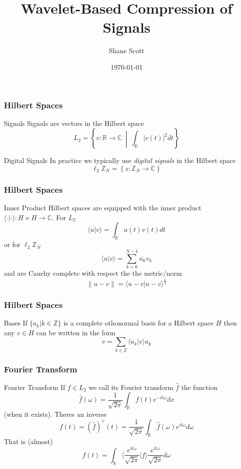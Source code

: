 \documentclass[10pt]{beamer}
\title{Wavelet-Based Compression of Signals}
\author{ Shane Scott }
\date{\today}
\institute{Kansas State University}
\newcommand{\Z}{\mathbb{Z}}
\newcommand{\C}{\mathbb{C}}
\newcommand{\R}{\mathbb{R}}
\begin{document}
\begin{frame}
\titlepage
\end{frame}

\begin{frame}
\frametitle{Hilbert Spaces}
\begin{block}
{Signals} Signals are vectors in the Hilbert space
$$
L_2 = \left \{ v: \R \to \C \  \middle | \ \int_\R |v(t)|^2 dt \right \}
$$
\end{block}
\pause
\begin{block}
{Digital Signals}
In practice we typically use \emph{digital signals} in the Hilbert space 
$$
\ell_2\Z_N = \left \{ z: \Z_N \to \C  \right \}
$$
\end{block}
\end{frame}

\begin{frame}
\frametitle{Hilbert Spaces}
\begin{block}
{Inner Product} Hilbert spaces are equipped with the inner product $\langle \cdot | \cdot \rangle: H \times H \to \C$. For $L_2$
$$
\langle u|v\rangle= \int_\R \overline{u(t)}v(t) dt
$$
\pause or for $\ell_2 \Z_N$
$$
\langle u|v\rangle = \sum^{N-1}_{k=0} \overline{u_k}{v_k}
$$
\pause and are Cauchy complete with respect the the metric/norm
$$
\|u-v\|=\langle u-v|u-v \rangle^\frac{1}{2}
$$
\end{block}
\end{frame}

\begin{frame}
\frametitle{Hilbert Spaces}
\begin{block}
{Bases}
If $\{a_k | k \in \Z\}$ is a complete othonormal basis for a Hilbert space $H$ then any $v \in H$ can be written in the form
$$
v=\sum_{k \in \Z} \langle a_k|v \rangle a_k
$$
\end{block}
\end{frame}

\begin{frame}
\frametitle{Fourier Transform}
\begin{block}
{Fourier Transform}
If $f \in L_2$ we call its Fourier transform $\hat f$ the function
$$
\hat f (\omega)= \frac 1 {\sqrt{2\pi}}\int_\R f(t)e^{-it\omega} dx
$$
(when it exists). \pause Theres an inverse
$$
f(t)=(\hat f )^\vee (t)= \frac 1 {\sqrt{2\pi}}\int_\R \hat f(\omega)e^{it\omega} d\omega
$$
\pause That is (almost)
$$
f(t)=\int_\R \langle \frac{e^{it\omega}}{\sqrt{2\pi}} |f\rangle \frac{e^{it\omega}}{\sqrt{2\pi}} d\omega
$$
\end{block}
\end{frame}
\end{document}
